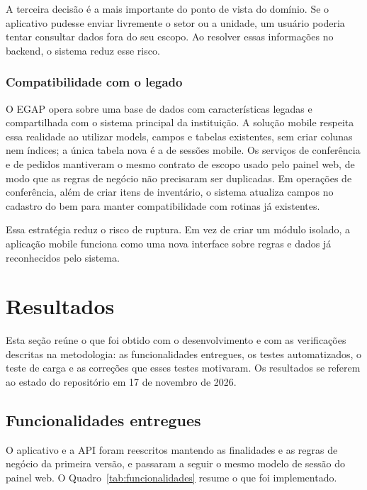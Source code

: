 \documentclass[12pt,a4paper]{article}
\begin{document}
A terceira decisão é a mais importante do ponto de vista do domínio. Se o aplicativo pudesse enviar livremente o setor ou a unidade, um usuário poderia tentar consultar dados fora do seu escopo. Ao resolver essas informações no backend, o sistema reduz esse risco.

\subsubsection{Compatibilidade com o legado}

O EGAP opera sobre uma base de dados com características legadas e compartilhada com o sistema principal da instituição. A solução mobile respeita essa realidade ao utilizar models, campos e tabelas existentes, sem criar colunas nem índices; a única tabela nova é a de sessões mobile. Os serviços de conferência e de pedidos mantiveram o mesmo contrato de escopo usado pelo painel web, de modo que as regras de negócio não precisaram ser duplicadas. Em operações de conferência, além de criar itens de inventário, o sistema atualiza campos no cadastro do bem para manter compatibilidade com rotinas já existentes.

Essa estratégia reduz o risco de ruptura. Em vez de criar um módulo isolado, a aplicação mobile funciona como uma nova interface sobre regras e dados já reconhecidos pelo sistema.

\section{Resultados}

Esta seção reúne o que foi obtido com o desenvolvimento e com as verificações descritas na metodologia: as funcionalidades entregues, os testes automatizados, o teste de carga e as correções que esses testes motivaram. Os resultados se referem ao estado do repositório em 17 de novembro de 2026.

\subsection{Funcionalidades entregues}

O aplicativo e a API foram reescritos mantendo as finalidades e as regras de negócio da primeira versão, e passaram a seguir o mesmo modelo de sessão do painel web. O Quadro~\ref{tab:funcionalidades} resume o que foi implementado.
\end{document}
